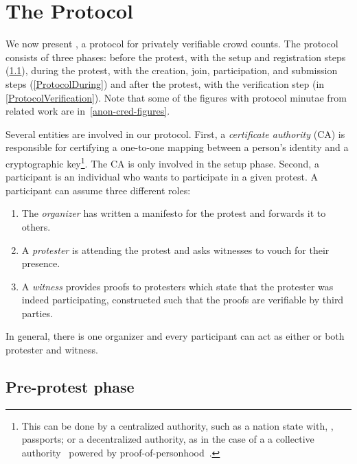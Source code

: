 \section{The \CROCUS Protocol}
\label{Protocol}


We now present \CROCUS, a protocol for privately verifiable crowd counts.
The protocol consists of three phases:
before the protest, with the setup and registration steps (\cref{ProtocolSetup}),
during the protest, with the creation, join, participation, and submission steps (\cref{ProtocolDuring})
and after the protest, with the verification step (in
\cref{ProtocolVerification}). Note that some of the figures with
protocol minutae from related work are in~\cref{anon-cred-figures}.

Several entities are involved in our protocol.
First, a \emph{certificate authority} (\ac{CA}) is responsible for certifying a one-to-one mapping between a 
person's identity and a cryptographic key\footnote{%
  This can be done by a centralized authority, such as a nation state with, 
  \eg, passports; or a decentralized authority, as in the case of a a 
  collective authority~\cite{collective-signing} powered by 
  proof-of-personhood~\cite{proof-of-personhood}.
}.
The \ac{CA} is only involved in the setup phase.
Second, a participant is an individual who wants to participate in a given 
protest.
A participant can assume three different roles:
\begin{enumerate}
\item The \emph{organizer} has written a manifesto for the protest and forwards it to others.
\item A \emph{protester} is attending the protest and asks witnesses to vouch 
  for their presence.
\item A \emph{witness} provides proofs to protesters which state that the 
  protester was indeed participating, constructed such that the proofs are verifiable by 
  third parties.
\end{enumerate}
In general, there is one organizer and every participant can act as
either or both protester and witness.

\subsection{Pre-protest phase}%
\label{ProtocolSetup}

